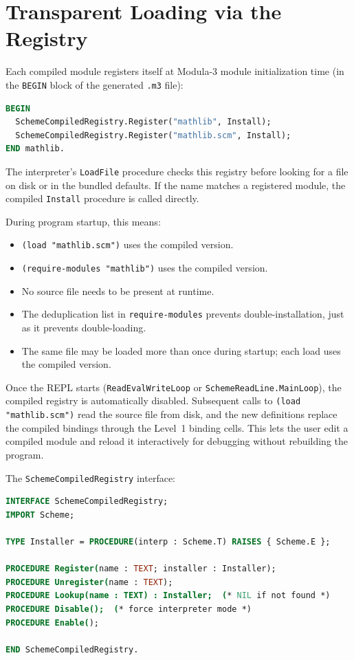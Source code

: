 \documentclass[12pt]{report}
\begin{document}
\section{Transparent Loading via the Registry}\label{sec:registry}

Each compiled module registers itself at Modula-3 module initialization
time (in the \texttt{BEGIN} block of the generated \texttt{.m3} file):

\begin{lstlisting}[language=Modula3]
BEGIN
  SchemeCompiledRegistry.Register("mathlib", Install);
  SchemeCompiledRegistry.Register("mathlib.scm", Install);
END mathlib.
\end{lstlisting}

The interpreter's \texttt{LoadFile} procedure checks this registry
before looking for a file on disk or in the bundled defaults.  If
the name matches a registered module, the compiled \texttt{Install}
procedure is called directly.

During program startup, this means:
\begin{itemize}
\item \texttt{(load "mathlib.scm")} uses the compiled version.
\item \texttt{(require-modules "mathlib")} uses the compiled version.
\item No source file needs to be present at runtime.
\item The deduplication list in \texttt{require-modules} prevents
  double-installation, just as it prevents double-loading.
\item The same file may be loaded more than once during startup;
  each load uses the compiled version.
\end{itemize}

Once the REPL starts (\texttt{ReadEvalWriteLoop} or
\texttt{SchemeReadLine.MainLoop}), the compiled registry is
automatically disabled.  Subsequent calls to \texttt{(load
"mathlib.scm")} read the source file from disk, and the new
definitions replace the compiled bindings through the Level~1
binding cells.  This lets the user edit a compiled module and
reload it interactively for debugging without rebuilding the
program.

The \texttt{SchemeCompiledRegistry} interface:

\begin{lstlisting}[language=Modula3]
INTERFACE SchemeCompiledRegistry;
IMPORT Scheme;

TYPE Installer = PROCEDURE(interp : Scheme.T) RAISES { Scheme.E };

PROCEDURE Register(name : TEXT; installer : Installer);
PROCEDURE Unregister(name : TEXT);
PROCEDURE Lookup(name : TEXT) : Installer;  (* NIL if not found *)
PROCEDURE Disable();  (* force interpreter mode *)
PROCEDURE Enable();

END SchemeCompiledRegistry.
\end{lstlisting}
\end{document}
